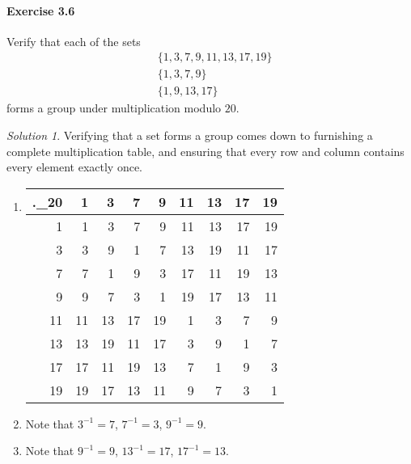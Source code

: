 \documentclass[11pt]{report}
\theoremstyle{remark}
\newtheorem*{solution}{Solution}
\begin{document}
    \paragraph{Exercise 3.6} Verify that each of the sets \begin{align*}
        &\{1, 3, 7, 9, 11, 13, 17, 19\} \\
        &\{1, 3, 7, 9\} \\
        &\{1, 9, 13, 17\}
    \end{align*} forms a group under multiplication modulo $20$.
    \begin{solution}
        Verifying that a set forms a group comes down to furnishing a complete
        multiplication table, and ensuring that every row and column contains
        every element exactly once.
        \begin{enumerate}
            \item \mbox{}
            \begin{center}
                \begin{tabular}{r|rrrrrrrr}
                    ._{20}  &  1 &  3 &  7 &  9 & 11 & 13 & 17 & 19 \\\hline
                    1       &  1 &  3 &  7 &  9 & 11 & 13 & 17 & 19 \\
                    3       &  3 &  9 &  1 &  7 & 13 & 19 & 11 & 17 \\
                    7       &  7 &  1 &  9 &  3 & 17 & 11 & 19 & 13 \\
                    9       &  9 &  7 &  3 &  1 & 19 & 17 & 13 & 11 \\
                    11      & 11 & 13 & 17 & 19 &  1 &  3 &  7 &  9 \\
                    13      & 13 & 19 & 11 & 17 &  3 &  9 &  1 &  7 \\
                    17      & 17 & 11 & 19 & 13 &  7 &  1 &  9 &  3 \\
                    19      & 19 & 17 & 13 & 11 &  9 &  7 &  3 &  1
                \end{tabular}
            \end{center}
            \item Note that $3^{-1} = 7$, $7^{-1} = 3$, $9^{-1} = 9$.
            \item Note that $9^{-1} = 9$, $13^{-1} = 17$, $17^{-1} = 13$.
        \end{enumerate}
    \end{solution}
    
\end{document}
